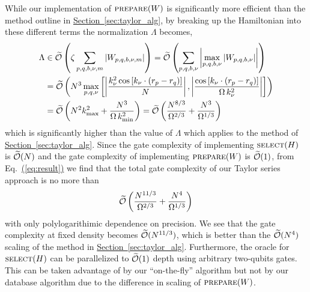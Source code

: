 \documentclass[superscriptaddress,aps,pra,nofootinbib,notitlepage,10pt,longbibliography]{revtex4-1}
\newcommand{\eq}[1]{Eq.~\hyperref[eq:#1]{(\ref*{eq:#1})}}
\renewcommand{\sec}[1]{\hyperref[sec:#1]{Section~\ref*{sec:#1}}}
\begin{document}
While our implementation of $\textsc{prepare}(W)$ is significantly more efficient than the method outline in \sec{taylor_alg}, by breaking up the Hamiltonian into these different terms the normalization $\Lambda$ becomes,
\begin{align}
\label{eq:fly_lambda}
\Lambda & \in \widetilde{\cal O}\left( \zeta \sum_{p,q,b,\nu,m} \left | W_{p,q,b,\nu,m} \right | \right) =  \widetilde{\cal O}\left(\sum_{p,q,b,\nu} \left | \max_{p,q,b,\nu} \left |W_{p,q,b,\nu} \right | \right | \right)\\
%
& = \widetilde{\cal O}\left(N^3 \max_{p,q,\nu} \left[ \left |\frac{k_\nu^2 \cos \left[k_\nu \cdot \left(r_p - r_q\right)\right]}{N}  \right |, \left| \frac{\cos \left[k_\nu \cdot \left(r_p - r_q\right)\right]}{\Omega \, k_\nu^2} \right |  \right]\right)\nonumber\\
& = \widetilde{\cal O}\left( N^2 k_{\textrm{max}}^2 + \frac{N^3}{\Omega \, k_{\textrm{min}}^2} \right)
%
= \widetilde{\cal O}\left( \frac{N^{8/3}}{\Omega^{2 /3}} + \frac{N^3}{ \Omega^{1/3}} \right) \nonumber
\end{align}
which is significantly higher than the value of $\Lambda$ which applies to the method of \sec{taylor_alg}. Since the gate complexity of implementing $\textsc{select}(H)$ is $\widetilde{\cal O}(N)$ and the gate complexity of implementing $\textsc{prepare}(W)$ is $\widetilde{\cal O}(1)$, from \eq{result} we find that the total gate complexity of our Taylor series approach is no more than
\begin{equation}
\widetilde{\cal O}\left( \frac{N^{11/3}}{\Omega^{2 /3}} + \frac{N^4}{\Omega^{1/3}}\right)
\end{equation}
with only polylogarithimic dependence on precision. We see that the gate complexity at fixed density becomes $\widetilde{\cal O}(N^{11/3})$, which is better than the $\widetilde{\cal O}(N^4)$ scaling of the method in \sec{taylor_alg}. Furthermore, the oracle for $\textsc{select}(H)$ can be parallelized to $\widetilde{\cal O}(1)$ depth using arbitrary two-qubits gates. This can be taken advantage of by our ``on-the-fly'' algorithm but not by our database algorithm due to the difference in scaling of $\textsc{prepare}(W)$. 
\end{document}
